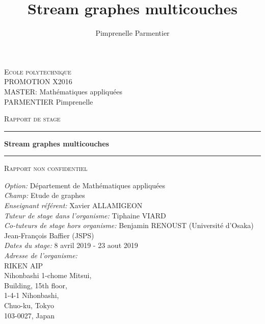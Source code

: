 \documentclass[11pt,a4paper]{article}
\author{Pimprenelle Parmentier}
\title{Stream graphes multicouches}
\theoremstyle{definition}
\theoremstyle{remark}
\theoremstyle{remark}
\begin{document}
\begin{titlepage}


\noindent
\textsc{Ecole polytechnique}\\
PROMOTION X2016 \\
MASTER: Mathématiques appliquées\\
PARMENTIER Pimprenelle

\vspace{3cm}
\begin{center}
\textsc{\Large Rapport de stage}
\vspace{1cm}
\hrule %
\vspace{0.4cm}
{\huge \bfseries Stream graphes multicouches \par}\vspace{0.4cm} %
\hrule 
\vspace{1cm}
\textsc{\Large Rapport non confidentiel}
\vspace{4cm} %
 
\end{center}

\noindent
\textit{Option:} Département de Mathématiques appliquées\\
\textit{Champ:} Etude de graphes\\
\textit{Enseignant référent:} Xavier ALLAMIGEON\\
\textit{Tuteur de stage dans l'organisme:} Tiphaine VIARD\\
\textit {Co-tuteurs de stage hors organisme:} Benjamin RENOUST (Université d'Osaka)\\
\hspace*{6.1cm} Jean-François Baffier (JSPS)\\
\textit{Dates du stage:} 8 avril 2019 - 23 aout 2019\\
\textit{Adresse de l'organisme:}\\
RIKEN AIP\\
Nihonbashi 1-chome Mitsui,\\
Building, 15th floor,\\
1-4-1 Nihonbashi,\\
Chuo-ku, Tokyo\\
103-0027, Japan\\
\end{titlepage}


\begin{abstract}

\end{abstract}
\end{document}
